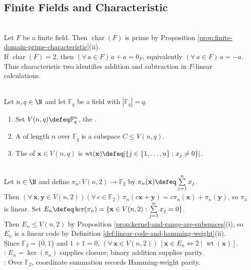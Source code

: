 \subsection{Finite Fields and Characteristic}

\begin{perspective} \label{per:finite-fields-and-characteristic-two} \\
Let $F$ be a finite field. Then $\operatorname{char}(F)$ is prime by Proposition \ref{prop:finite-domain-prime-characteristic}(ii).\\
If $\operatorname{char}(F)=2$, then $(\forall\,a\in F)\,a+a=0_F$, equivalently $(\forall\,a\in F)\,a=-a$.\\
Thus characteristic two identifies addition and subtraction in $F$-linear calculations.
\end{perspective}

\begin{definition} \label{def:linear-code-and-hamming-weight} \\
Let $n,q\in\N$ and let $\mathbb{F}_q$ be a field with $|\mathbb{F}_q|=q$.
\begin{enumerate}[label=(\roman*)]
\setlength{\itemsep}{0pt}
\item Set $V(n,q)\defeq\mathbb{F}_q^n$, the .
\item A  of length $n$ over $\mathbb{F}_q$ is a subspace $C\leq V(n,q)$.
\item The  of $\mathbf{x}\in V(n,q)$ is $\operatorname{wt}(\mathbf{x})\defeq|\{j\in\{1,\ldots,n\}:x_j\neq0\}|$.
\end{enumerate}
\end{definition}

\begin{example} \label{ex:linear-codes-even-weight-subspace} \\
Let $n\in\N$ and define $\pi_n:V(n,2)\to\mathbb{F}_2$ by $\pi_n(\mathbf{x})\defeq\sum\limits_{j=1}^{n}x_j$.\\
Then $(\forall\,\mathbf{x},\mathbf{y}\in V(n,2))(\forall\,c\in\mathbb{F}_2)\,\pi_n(c\mathbf{x}+\mathbf{y})=c\pi_n(\mathbf{x})+\pi_n(\mathbf{y})$, so $\pi_n$ is linear. Set $E_n\defeq\ker(\pi_n)=\{\mathbf{x}\in V(n,2):\sum\limits_{j=1}^{n}x_j=0\}$.\\
Then $E_n\leq V(n,2)$ by Proposition \ref{prop:kernel-and-range-are-subspaces}(i), so $E_n$ is a linear code by Definition \ref{def:linear-code-and-hamming-weight}(ii).\\
Since $\mathbb{F}_2=\{0,1\}$ and $1+1=0$, $(\forall\,\mathbf{x}\in V(n,2))\,[\mathbf{x}\in E_n\Longleftrightarrow2\mid\operatorname{wt}(\mathbf{x})]$.\\
: $E_n=\ker(\pi_n)$ supplies closure; binary addition supplies parity.\\
: Over $\mathbb{F}_2$, coordinate summation records Hamming-weight parity.
\end{example}

